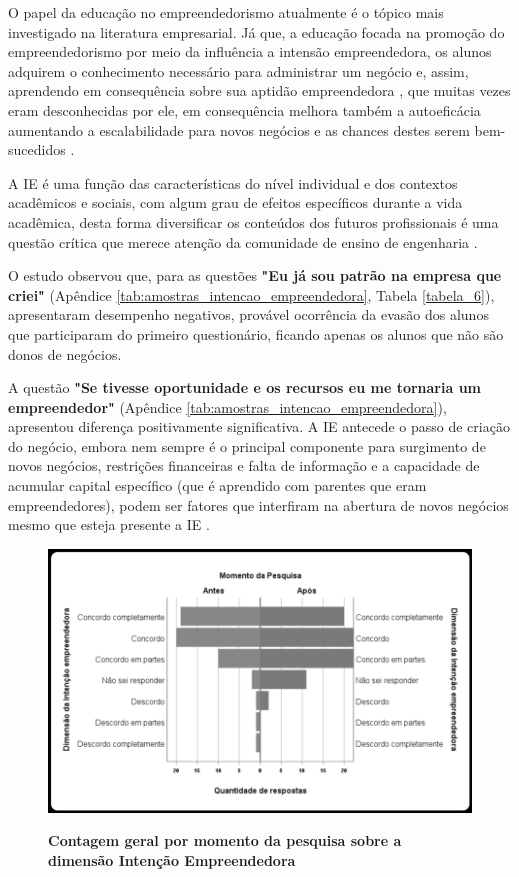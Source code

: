 O papel da educação no empreendedorismo atualmente é o tópico mais  investigado na literatura empresarial. Já que, a educação focada na promoção do empreendedorismo por meio da influência a intensão empreendedora, os alunos adquirem o conhecimento necessário para administrar um negócio e, assim, aprendendo em consequência sobre sua aptidão empreendedora \cite{nowinski_impact_2019}, que muitas vezes eram desconhecidas por ele, em consequência melhora também a autoeficácia \cite{egerova_does_2017} aumentando a escalabilidade para novos negócios e as chances destes serem bem-sucedidos \cite{kolstad_education_2015}.

A IE é uma função das características do nível individual e dos contextos acadêmicos e sociais, com algum grau de efeitos específicos durante a vida acadêmica, desta forma diversificar os conteúdos dos futuros profissionais é uma questão crítica que merece atenção da comunidade de ensino de engenharia \cite{gilmartin_entrepreneurial_2019}.

O estudo observou que, para as questões \textbf{"Eu já sou patrão na empresa que criei"} (Apêndice \ref{tab:amostras_intencao_empreendedora}, Tabela \ref{tabela_6}), apresentaram desempenho negativos, provável ocorrência da evasão dos alunos que participaram do primeiro questionário, ficando apenas os alunos que não são donos de negócios. 


A questão \textbf{"Se tivesse oportunidade e os recursos eu me tornaria um empreendedor"} (Apêndice \ref{tab:amostras_intencao_empreendedora}), apresentou diferença positivamente significativa. A IE antecede o passo de criação do negócio, embora nem sempre é o principal componente para surgimento de novos negócios, restrições financeiras e falta de informação e a capacidade de acumular capital específico (que é aprendido com parentes que eram empreendedores), podem ser fatores que interfiram na abertura de novos negócios mesmo que esteja presente a IE \cite{auguste_what_2016}.


\begin{figure}[H]
\centering
\caption{\textbf{Contagem geral por momento da pesquisa sobre a dimensão Intenção Empreendedora}}
\includegraphics[scale=0.4]{Imagens/intencao_empreendedora.png}
\label{figura_45}
\end{figure}




